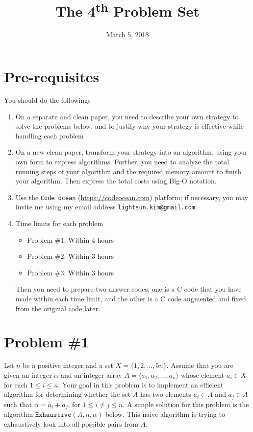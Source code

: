 \documentclass{article}
\date{March 5, 2018}
\title{The 4\textsuperscript{th} Problem Set}
\begin{document}
\maketitle
\section*{Pre-requisites}
You should do the followings
\begin{enumerate}
\item On a separate and clean paper,  you need to describe your own strategy to solve the problems below, and 
	to justify why your strategy is effective while handling each problem
\item On a new clean paper, transform your strategy into an algorithm, using your own form to express algorithms.
	Further, you need to analyze the total running steps of your algorithm and the required memory amount to finish your algorithm.
	Then express the total costs using Big-O notation.
\item Use the \texttt{Code ocean} (\url{https://codeocean.com}) platform; if necessary, you may invite me using my email address 
\texttt{lightsun.kim@gmail.com}.
\item Time limits for each problem
\begin{itemize}
\item Problem \#1: Within 4 hours
\item Problem \#2: Within 3 hours
\item Problem \#3: Within 3 hours
\end{itemize}
Then you need to prepare two answer codes; one is a C code that you have made within each time limit, and the
other is a C code augmented and fixed from the original code later.
\end{enumerate}

\newpage

\section{Problem \#1}

Let $n$ be a positive integer and a set $X=\{1,2,\ldots,5n\}$.
Assume that you are given an integer $\alpha$ and an integer array $A=\langle a_1,a_2,\ldots,a_n\rangle$  
whose element $a_i\in X$ for each $1\leq i\leq n$. Your goal in this problem is to implement an efficient algorithm 
for determining whether the set $A$ has two elements $a_i\in A$ and $a_j\in A$ 
such that $\alpha=a_i+a_j$, for $1\leq i\neq j\leq n$.  A simple solution for this problem is the algorithm $\mathtt{Exhaustive}(A,n,\alpha)$ below. 
This naive algorithm is trying to exhaustively look into all possible pairs from $A$.
\end{document}
